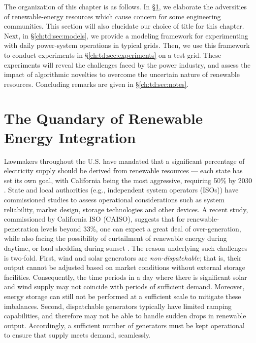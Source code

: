 The organization of this chapter is as follows. In \S\ref{ch:td:sec:quandary}, we elaborate the adversities of renewable-energy resources which cause concern for some engineering communities. This section will also elucidate our choice of title for this chapter. Next, in \S\ref{ch:td:sec:models}, we provide a modeling framework for experimenting with daily power-system operations in typical grids. Then, we use this framework to conduct experiments in \S\ref{ch:td:sec:experiments} on a test grid. These experiments will reveal the challenges faced by the power industry, and assess the impact of algorithmic novelties to overcome the uncertain nature of renewable resources. Concluding remarks are given in \S\ref{ch:td:sec:notes}.

\section{The Quandary of Renewable Energy Integration} \label{ch:td:sec:quandary}

Lawmakers throughout the U.S. have mandated that a significant percentage of electricity supply should be derived from renewable resources --- each state has set its own goal, with California being the most aggressive, requiring 50\% by 2030 \citep{CalBill2015}. State and local authorities (e.g., independent system operators (ISOs)) have commissioned studies to assess operational considerations such as system reliability, market design, storage technologies and other devices. A recent study, commissioned by California ISO (CAISO), suggests that for renewable-penetration levels beyond 33\%, one can expect a great deal of over-generation, while also facing the possibility of curtailment of renewable energy during daytime, or load-shedding during sunset \citep{Olson2015}. The reason underlying such challenges is two-fold. First, wind and solar generators are \textit{non-dispatchable}; that is, their output cannot be adjusted based on market conditions without external storage facilities. Consequently, the time periods in a day where there is significant solar and wind supply may not coincide with periods of sufficient demand. Moreover, energy storage can still not be performed at a sufficient scale to mitigate these imbalances. Second, dispatchable generators typically have limited ramping capabilities, and therefore may not be able to handle sudden drops in renewable output. Accordingly, a sufficient number of generators must be kept operational to ensure that supply meets demand, seamlessly.

